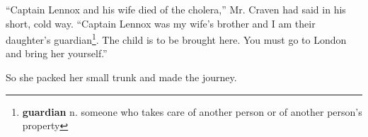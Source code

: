``Captain Lennox and his wife died of the cholera,'' Mr. Craven had said in his short, cold way. ``Captain Lennox was my wife's brother and I am their daughter's guardian\footnote{\textbf{guardian} n. someone who takes care of another person or of another person's property}. The child is to be brought here. You must go to London and bring her yourself.''

So she packed her small trunk and made the journey.

